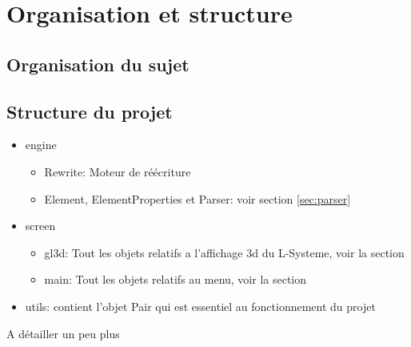 \chapter{Organisation et structure}

\section{Organisation du sujet}

\section{Structure du projet}
\begin{itemize}
    \item engine
    \begin{itemize}
        \item Rewrite: Moteur de réécriture
        \item Element, ElementProperties et Parser: voir section \ref{sec:parser}
    \end{itemize}
    \item screen
    \begin{itemize}
        \item gl3d: Tout les objets relatifs a l'affichage 3d du L-Systeme, voir la section \label{src:interface3d}
        \item main: Tout les objets relatifs au menu, voir la section \label{sec:menu}
    \end{itemize}
    \item utils: contient l'objet Pair qui est essentiel au fonctionnement du projet
\end{itemize}

A détailler un peu plus
